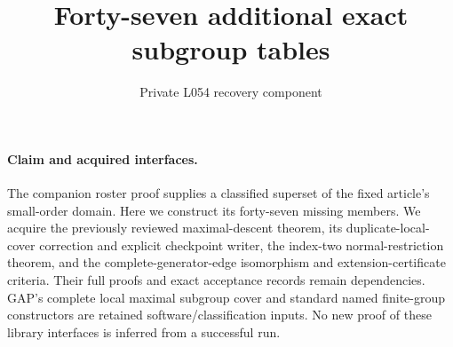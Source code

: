 \documentclass[11pt]{article}
\title{Forty-seven additional exact subgroup tables}
\author{Private L054 recovery component}\date{}
\begin{document}
\maketitle
\paragraph{Claim and acquired interfaces.}
The companion roster proof supplies a classified superset of the fixed
article's small-order domain. Here we construct its forty-seven missing
members. We acquire the previously reviewed maximal-descent theorem,
its duplicate-local-cover correction and explicit checkpoint writer,
the index-two normal-restriction theorem, and the complete-generator-edge
isomorphism and extension-certificate criteria. Their full proofs and
exact acceptance records remain dependencies. GAP's complete local maximal
subgroup cover and standard named finite-group constructors are retained
software/classification inputs. No new proof of these library interfaces
is inferred from a successful run.
\end{document}
